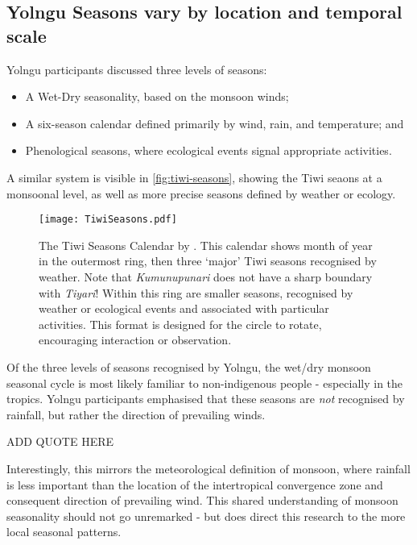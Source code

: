 \subsection{Yolngu Seasons vary by location and temporal scale}

Yolngu participants discussed three levels of seasons:
\begin{itemize}
\item A Wet-Dry seasonality, based on the monsoon winds;
\item A six-season calendar defined primarily by wind, rain, and temperature; and
\item Phenological seasons, where ecological events signal appropriate activities.
\end{itemize}

A similar system is visible in \autoref{fig:tiwi-seasons}, showing the Tiwi seaons at
a monsoonal level, as well as more precise seasons defined by weather or ecology.


\begin{landscape}
\begin{figure}[p]
    \centering
    \texttt{[image: TiwiSeasons.pdf]}
    \caption[The Tiwi Seasons Calendar by \citet{CSIROcals}]{
        The Tiwi Seasons Calendar by \citet{CSIROcals}.
        This calendar shows month of year in the outermost ring,
        then three `major' Tiwi seasons recognised by weather.
        Note that \textit{Kumunupunari} does not have a sharp boundary with \textit{Tiyari}!
        Within this ring are smaller seasons, recognised by weather
        or ecological events and associated with particular activities.
        This format is designed for the circle to rotate, encouraging interaction or observation.
        }
    \label{fig:tiwi-seasons}
\end{figure}
\end{landscape}


Of the three levels of seasons recognised by Yolngu,
the wet/dry monsoon seasonal cycle is most likely familiar to non-indigenous people -
especially in the tropics.  Yolngu participants emphasised that these seasons
are \emph{not} recognised by rainfall, but rather the direction of prevailing winds.

ADD QUOTE HERE

Interestingly, this mirrors the meteorological definition of monsoon, where rainfall is less important than
the location of the intertropical convergence zone and consequent direction of prevailing wind.
This shared understanding of monsoon seasonality should not go unremarked -
but does direct this research to the more local seasonal patterns.


